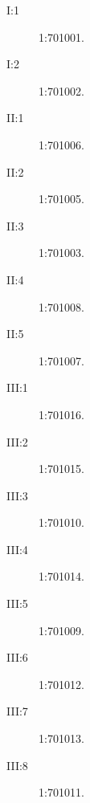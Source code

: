 \documentclass{article}
\begin{document}
\begin{description}
\item[I:1] 1:701001.
\item[I:2] 1:701002.
\item[II:1] 1:701006.
\item[II:2] 1:701005.
\item[II:3] 1:701003.
\item[II:4] 1:701008.
\item[II:5] 1:701007.
\item[III:1] 1:701016.
\item[III:2] 1:701015.
\item[III:3] 1:701010.
\item[III:4] 1:701014.
\item[III:5] 1:701009.
\item[III:6] 1:701012.
\item[III:7] 1:701013.
\item[III:8] 1:701011.
\end{description}
\end{document}
